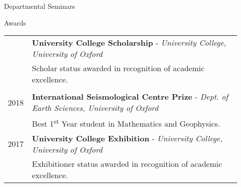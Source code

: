 \documentclass{resume}
\begin{document}
\begin{rSection}{Departmental Seminars}
\begin{rSection}{Awards}
\begin{tabular}{p{0.07\linewidth} | p{0.87\linewidth}}
& \textbf{University College Scholarship} - \textit{University College, University of Oxford} \\ & \hspace{0.7cm} Scholar status awarded in recognition of academic excellence. \\ 
\\
2018& \textbf{International Seismological Centre Prize } - \textit{Dept. of Earth Sciences, University of Oxford} \\ & \hspace{0.7cm} Best 1\textsuperscript{st} Year student in Mathematics and Geophysics.

\\
2017 & \textbf{University College Exhibition} - \textit{University College, University of Oxford} \\ & \hspace{0.7cm} Exhibitioner status awarded in recognition of academic excellence. \\ 


\end{tabular}
\end{rSection}






\end{rSection}
\end{document}
